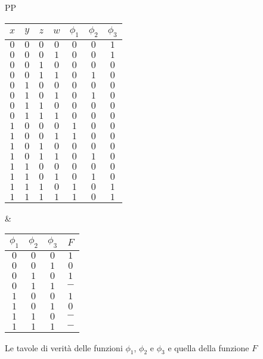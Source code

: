\documentclass[a4paper]{extarticle}
\renewcommand\arraystretch{}
\begin{document}
\vspace{1em}
\noindent
\begin{figure}[H]
    \centering
    \begin{tabularx}{\textwidth}{PP}
      {
        \setlength{\tabcolsep}{8pt}
        \renewcommand{\arraystretch}{1.2}
        \begin{tabular}{cccc|ccc}
          $x$ & $y$ & $z$ & $w$ & $\phi_1$ & $\phi_2$ & $\phi_3$\\
          \hline
          $0$ & $0$ & $0$ & $0$ & $0$ & $0$ & $1$\\
          $0$ & $0$ & $0$ & $1$ & $0$ & $0$ & $1$\\
          $0$ & $0$ & $1$ & $0$ & $0$ & $0$ & $0$\\
          $0$ & $0$ & $1$ & $1$ & $0$ & $1$ & $0$\\
          $0$ & $1$ & $0$ & $0$ & $0$ & $0$ & $0$\\
          $0$ & $1$ & $0$ & $1$ & $0$ & $1$ & $0$\\
          $0$ & $1$ & $1$ & $0$ & $0$ & $0$ & $0$\\
          $0$ & $1$ & $1$ & $1$ & $0$ & $0$ & $0$\\
          $1$ & $0$ & $0$ & $0$ & $1$ & $0$ & $0$\\
          $1$ & $0$ & $0$ & $1$ & $1$ & $0$ & $0$\\
          $1$ & $0$ & $1$ & $0$ & $0$ & $0$ & $0$\\
          $1$ & $0$ & $1$ & $1$ & $0$ & $1$ & $0$\\
          $1$ & $1$ & $0$ & $0$ & $0$ & $0$ & $0$\\
          $1$ & $1$ & $0$ & $1$ & $0$ & $1$ & $0$\\
          $1$ & $1$ & $1$ & $0$ & $1$ & $0$ & $1$\\
          $1$ & $1$ & $1$ & $1$ & $1$ & $0$ & $1$\\
        \end{tabular}
      } & {
          \setlength{\tabcolsep}{8pt}
          \renewcommand{\arraystretch}{1.2}
          \begin{tabular}{ccc|c}
            $\phi_1$ & $\phi_2$ & $\phi_3$ & $F$\\
            \hline
            $0$ & $0$ & $0$ & $1$\\
            $0$ & $0$ & $1$ & $0$\\
            $0$ & $1$ & $0$ & $1$\\
            $0$ & $1$ & $1$ & $-$\\
            $1$ & $0$ & $0$ & $1$\\
            $1$ & $0$ & $1$ & $0$\\
            $1$ & $1$ & $0$ & $-$\\
            $1$ & $1$ & $1$ & $-$\\
          \end{tabular}
      }
    \end{tabularx}
    \caption{Le tavole di verità delle funzioni $\phi_1$, $\phi_2$ e $\phi_3$ e quella della funzione $F$}
    \label{fig:tavola_verita_fi_e_F}
\end{figure}
\end{document}

